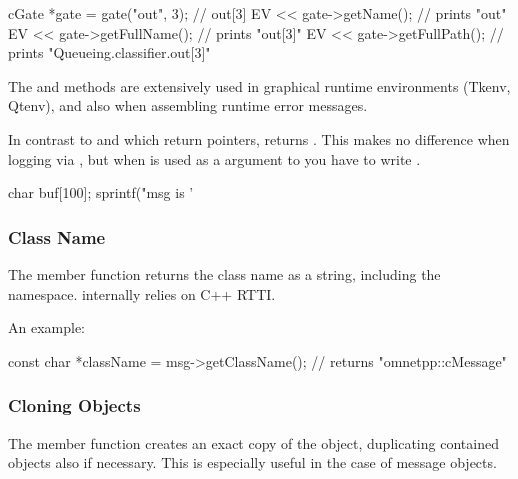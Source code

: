 \begin{cpp}
cGate *gate = gate("out", 3);  // out[3]
EV << gate->getName();  // prints "out"
EV << gate->getFullName();  // prints "out[3]"
EV << gate->getFullPath();  // prints "Queueing.classifier.out[3]"
\end{cpp}

The  and  methods are
extensively used in graphical runtime environments (Tkenv, Qtenv),
and also when assembling runtime error messages.

In contrast to  and  which return
 pointers,  returns
. This makes no difference when logging via ,
but when  is used as a  argument to
 you have to write .

\begin{cpp}
char buf[100];
sprintf("msg is '%
\end{cpp}


\subsubsection{Class Name}
\label{sec:sim-lib:classname}

The  member function returns the class
name as a string, including the namespace.  internally
relies on C++ RTTI.

An example:

\begin{cpp}
const char *className = msg->getClassName(); // returns "omnetpp::cMessage"
\end{cpp}


\subsubsection{Cloning Objects}
\label{sec:sim-lib:dup}

The  member function creates an exact copy of the
object, duplicating
contained objects also if necessary. This is especially useful in the
case of message objects.

